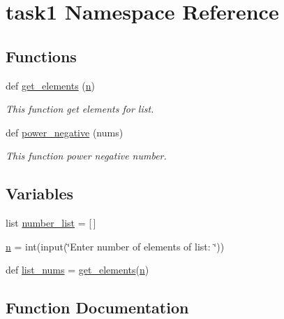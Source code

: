 \hypertarget{namespacetask1}{}\section{task1 Namespace Reference}
\label{namespacetask1}
\subsection*{Functions}
\begin{DoxyCompactItemize}
\item 
def \hyperlink{namespacetask1_a03f2500f1b4bf94c028ad81924233025}{get\+\_\+elements} (\hyperlink{namespacetask1_ade57eab2d5ddbd9bec59005ec4c19338}{n})
\begin{DoxyCompactList}\small\item\em This function get elements for list. \end{DoxyCompactList}\item 
def \hyperlink{namespacetask1_a16c470ef91d697c6523dc85de707f47d}{power\+\_\+negative} (nums)
\begin{DoxyCompactList}\small\item\em This function power negative number. \end{DoxyCompactList}\end{DoxyCompactItemize}
\subsection*{Variables}
\begin{DoxyCompactItemize}
\item 
list \hyperlink{namespacetask1_a4229f894904b6567dcab881d116dc574}{number\+\_\+list} = \mbox{[}$\,$\mbox{]}
\item 
\hyperlink{namespacetask1_ade57eab2d5ddbd9bec59005ec4c19338}{n} = int(input(\char`\"{}Enter number of elements of list\+: \char`\"{}))
\item 
def \hyperlink{namespacetask1_a48644f9ab3727dce9978f2f3afba1492}{list\+\_\+nums} = \hyperlink{namespacetask1_a03f2500f1b4bf94c028ad81924233025}{get\+\_\+elements}(\hyperlink{namespacetask1_ade57eab2d5ddbd9bec59005ec4c19338}{n})
\end{DoxyCompactItemize}


\subsection{Function Documentation}
\mbox{\label{namespacetask1_a03f2500f1b4bf94c028ad81924233025}} 
